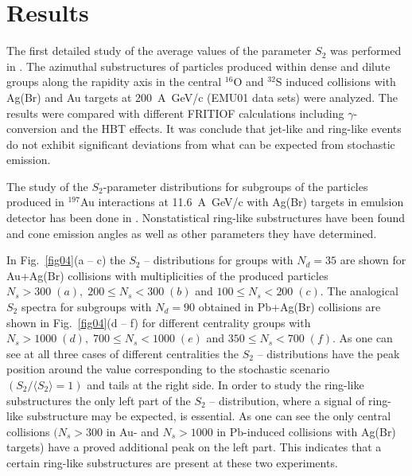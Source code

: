 \documentclass[12pt]{article}
\newcommand{\SDVA}{\langle S_2 \rangle}
\begin{document}

\section{Results}

The first detailed study of the average values of the parameter $S_2$ was performed in \cite{bib03}. The azimuthal substructures of particles produced within dense and dilute groups along the rapidity axis in the central ${}^{16}$O and ${}^{32}$S induced collisions with Ag(Br) and Au targets at 200~A~GeV/c (EMU01 data sets) were analyzed. The results were compared with different FRITIOF calculations including $\gamma$-conversion and the HBT effects. It was conclude that jet-like and ring-like events do not exhibit significant deviations from what can be expected from stochastic emission.

The study of the $S_2$-parameter distributions for subgroups of the particles produced in ${}^{197}$Au interactions at 11.6~A~GeV/c with Ag(Br) targets in emulsion detector has been done in \cite{bib17}. Nonstatistical ring-like substructures have been found and cone emission angles as well as other parameters they have determined. 

In Fig.~\ref{fig04}(a -- c) the $S_2$ -- distributions for groups with $N_d = 35$ are shown for Au+Ag(Br) collisions with multiplicities of the produced particles $N_s > 300\; (a),\; 200 \leq N_s < 300\; (b)$ and $100 \leq N_s < 200\; (c)$. The analogical $S_2$ spectra for subgroups with $N_d = 90$ obtained in Pb+Ag(Br) collisions are shown in Fig.~\ref{fig04}(d -- f) for different centrality groups with $N_s > 1000\; (d),\; 700 \leq N_s < 1000\; (e)$ and $350 \leq N_s < 700\; (f)$. As one can see at all three cases of different centralities the $S_2$ -- distributions have the peak position around the value corresponding to the stochastic scenario $(S_2/\SDVA = 1)$ and tails at the right side. In order to study the ring-like substructures the only left part of the $S_2$ -- distribution, where a signal of ring-like substructure may be expected, is essential. As one can see the only central collisions $(N_s > 300$ in Au- and $N_s > 1000$ in Pb-induced collisions with Ag(Br) targets) have a proved additional peak on the left part. This indicates that a certain ring-like substructures are present at these two experiments.\\
\end{document}
